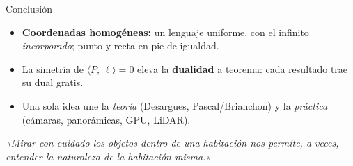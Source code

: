 \documentclass[aspectratio=169]{beamer}
\newcommand{\inc}[2]{\langle #1,\, #2\rangle}
\begin{document}
\begin{frame}{Conclusión}
  \begin{itemize}
    \item \textbf{Coordenadas homogéneas:} un lenguaje uniforme, con el
          infinito \emph{incorporado}; punto y recta en pie de igualdad.
    \item La simetría de $\inc{P}{\ell}=0$ eleva la \textbf{dualidad} a
          teorema: cada resultado trae su dual gratis.
    \item Una sola idea une la \emph{teoría} (Desargues, Pascal/Brianchon) y
          la \emph{práctica} (cámaras, panorámicas, GPU, LiDAR).
  \end{itemize}
  \vspace{0.5cm}
  \begin{block}{}
    \centering\itshape
    «Mirar con cuidado los objetos dentro de una habitación nos permite, a
    veces, entender la naturaleza de la habitación misma.»
  \end{block}
  \vspace{0.3cm}
\end{frame}
\end{document}
